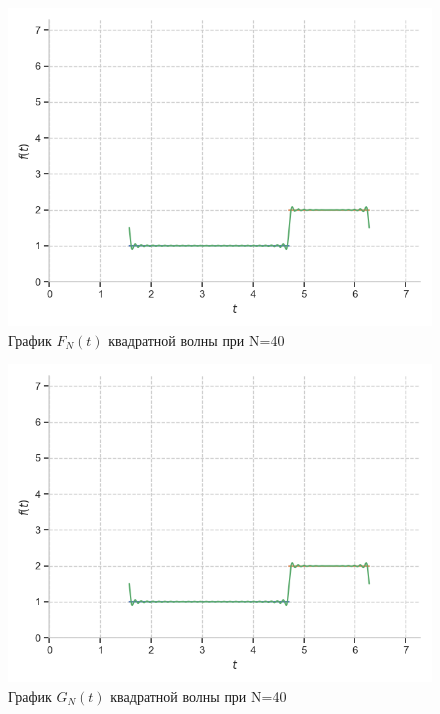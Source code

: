 \documentclass[a4paper, 16pt]{article}
\begin{document}
\begin{figure}[!htb]
    \centering
    \includegraphics[scale=0.8]{fur_sqwave_n=40.png}
    \captionsetup{skip=0pt}
    \caption{График $F_N(t)$ квадратной волны при N=40}
    \label{Рис:8}
\end{figure}
\begin{figure}[!htb]
    \centering
    \includegraphics[scale=0.8]{cfur_sqwave_n=40.png}
    \captionsetup{skip=0pt}
    \caption{График $G_N(t)$ квадратной волны при N=40}
    \label{Рис:9}
\end{figure}
\newpage
\end{document}
